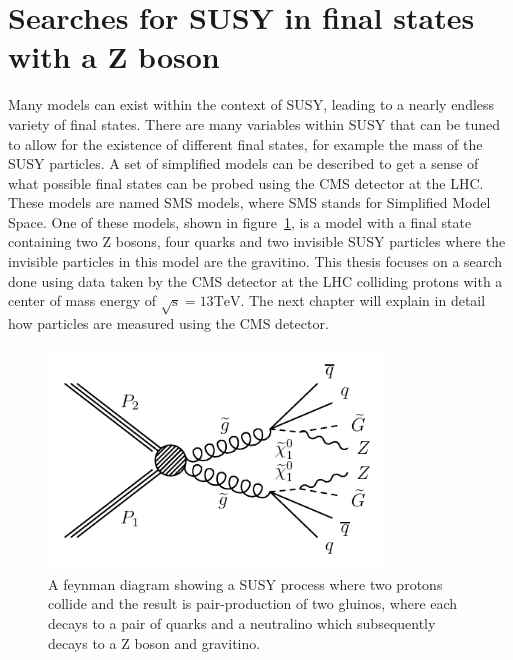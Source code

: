 \section{Searches for SUSY in final states with a Z boson}
\label{sec:signalmodel}
Many models can exist within the context of SUSY, leading to a nearly endless variety of final states.
There are many variables within SUSY that can be tuned to allow for the existence of different final states, for example the mass of the SUSY particles.
A set of simplified models can be described to get a sense of what possible final states can be probed using the CMS detector at the LHC.
These models are named SMS models, where SMS stands for Simplified Model Space.
One of these models, shown in figure~\ref{fig:SMS_T5ZZgmsb}, is a model with a final state containing two Z bosons,
four quarks and two invisible SUSY particles where the invisible particles in this model are the gravitino.
This thesis focuses on a search done using data taken by the CMS detector at the LHC colliding protons with a center of mass energy of $\mathrm{\sqrt{s}=13 TeV}$.
The next chapter will explain in detail how particles are measured using the CMS detector.

\begin{figure}[!htb]
  \begin{center}
    \includegraphics[width=0.8\textwidth]{intro/figs/Feynman_graph_T5ZZgmsb.pdf}
    \caption{
      \label{fig:SMS_T5ZZgmsb}
      A feynman diagram showing a SUSY process where two protons collide and the result is pair-production of two gluinos,
      where each decays to a pair of quarks and a neutralino which subsequently decays to a Z boson and gravitino.
    }
  \end{center}
\end{figure}
